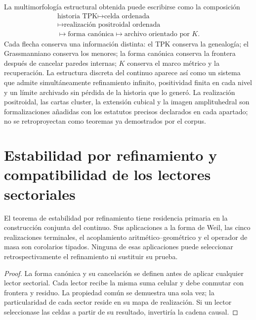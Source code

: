 La multimorfología estructural obtenida puede escribirse como la composición
\[
 \boxed{
 \begin{gathered}\text{historia TPK}\longmapsto\text{celda ordenada}\\
 \longmapsto\text{realización positroidal ordenada}\\
 \longmapsto\text{forma canónica}\longmapsto\text{archivo orientado por }K.\end{gathered}}
\]
Cada flecha conserva una información distinta: el TPK conserva la genealogía;
el Grassmanniano conserva los menores; la forma canónica conserva la frontera
después de cancelar paredes internas; \(K\) conserva el marco métrico y la
recuperación. La estructura discreta del continuo aparece así como un sistema
que admite simultáneamente refinamiento infinito, positividad finita en cada
nivel y un límite archivado sin pérdida de la historia que lo generó. La
realización positroidal, las cartas cluster, la extensión cubical y la imagen
amplituhedral son formalizaciones añadidas con los estatutos precisos
declarados en cada apartado; no se retroproyectan como teoremas ya demostrados
por el corpus.



\section{Estabilidad por refinamiento y compatibilidad de los lectores sectoriales}

\begin{theorem}
\label{geometria_positiva:thm:unidad-distribucion}
El teorema de estabilidad por refinamiento tiene residencia primaria en la
construcción conjunta del continuo. Sus aplicaciones a la forma de Weil, las
cinco realizaciones terminales, el acoplamiento aritmético--geométrico y el
operador de masa son corolarios tipados. Ninguna de esas aplicaciones puede
seleccionar retrospectivamente el refinamiento ni sustituir su prueba.
\end{theorem}
\begin{proof}
La forma canónica y su cancelación se definen antes de aplicar cualquier
lector sectorial. Cada lector recibe la misma suma celular y debe conmutar con
frontera y residuo. La propiedad común se demuestra una sola vez; la
particularidad de cada sector reside en su mapa de realización. Si un lector
seleccionase las celdas a partir de su resultado, invertiría la cadena causal.
\end{proof}

